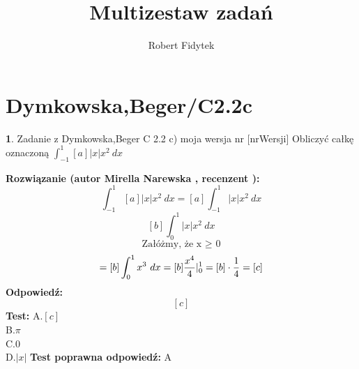 \documentclass[12pt, a4paper]{article}
\title{Multizestaw zadań}
\author{Robert Fidytek}
\date{}
\theoremstyle{definition} %
\newtheorem{zad}{}
\newcommand{\kategoria}[1]{\section{#1}} %
\newcommand{\zadStart}[1]{\begin{zad}#1\newline} %
\newcommand{\zadStop}{\end{zad}}   %
\newcommand{\rozwStart}[2]{\noindent \textbf{Rozwiązanie (autor #1 , recenzent #2): }\newline} %
\newcommand{\odpStart}{\noindent \textbf{Odpowiedź:}\newline}    %
\newcommand{\odpStop}{\newline}                                             %
\newcommand{\testStart}{\noindent \textbf{Test:}\newline} %
\newcommand{\testStop}{\newline} %
\newcommand{\kluczStart}{\noindent \textbf{Test poprawna odpowiedź:}\newline} %
\newcommand{\kluczStop}{\newline} %
\begin{document}
\maketitle



\kategoria{Dymkowska,Beger/C2.2c}
\zadStart{Zadanie z Dymkowska,Beger C 2.2 c) moja wersja nr [nrWersji]}
Obliczyć całkę oznaczoną $\displaystyle \int_{-1}^{1} [a]|x|x^2 \ dx $
\zadStop
\rozwStart{Mirella Narewska}{}
$$\int_{-1}^{1} [a]|x|x^2 \ dx= [a] \int_{-1}^{1} |x|x^2 \ dx$$
$$ [b] \int_{0}^{1} |x|x^2 \ dx$$
$$\text{Załóżmy, że x $\ge$ 0}$$
$$=[b]\int_{0}^{1} x^3 \ dx=[b] \frac{x^4}{4}\arrowvert_{0}^{1}=[b] \cdot \frac{1}{4}=[c]$$
\odpStart
$$[c]$$
\odpStop
\testStart
A.$[c]$
\\
B.$\pi$
\\
C.$0$
\\
D.$|x|$
\testStop
\kluczStart
A
\kluczStop
\end{document}

